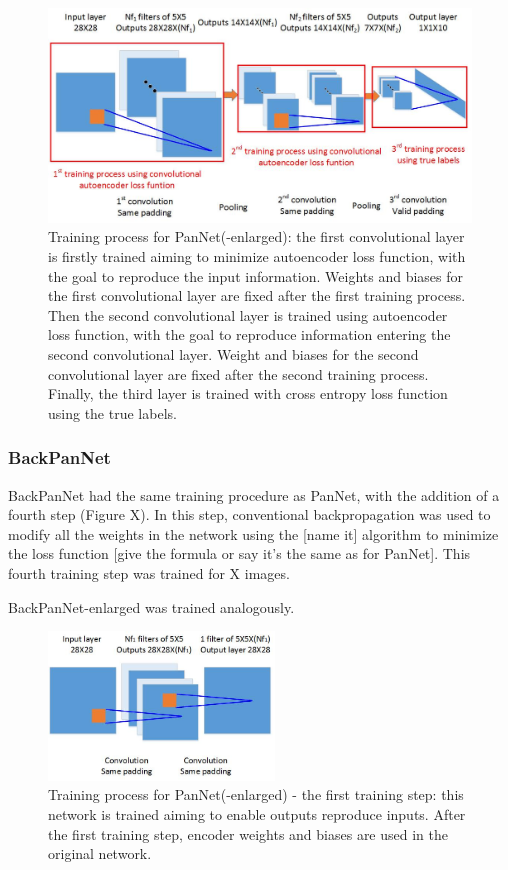 \begin{figure}[th]
\centering
\includegraphics[width=140mm]{Figures/PanNet-training}
\decoRule
\caption{Training process for PanNet(-enlarged): the first convolutional layer is firstly trained aiming to minimize autoencoder loss function, with the goal to reproduce the input information. Weights and biases for the first convolutional layer are fixed after the first training process. Then the second convolutional layer is trained using autoencoder loss function, with the goal to reproduce information entering the second convolutional layer. Weight and biases for the second convolutional layer are fixed after the second training process. Finally, the third layer is trained with cross entropy loss function using the true labels.}
\label{fig:PanNet-training}
\end{figure}

\subsubsection{BackPanNet}

BackPanNet had the same training procedure as PanNet, with the addition of a fourth step (Figure X). In this step, conventional backpropagation was used to modify all the weights in the network using the [name it] algorithm to minimize the loss function [give the formula or say it's the same as for PanNet]. This fourth training step was trained for X images.

BackPanNet-enlarged was trained analogously.

\begin{figure}[th]
\centering
\includegraphics[width=60mm]{Figures/PanNet_first_training}
\decoRule
\caption{Training process for PanNet(-enlarged) - the first training step: this network is trained aiming to enable outputs reproduce inputs. After the first training step, encoder weights and biases are used in the original network.}
\label{fig:PanNet_first_training}
\end{figure}

